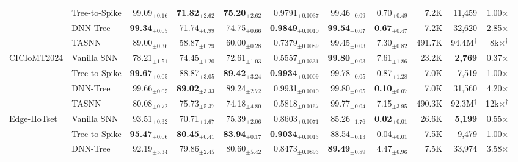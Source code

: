\begin{table}[!ht]
{\begin{tabular}{l l r r r r r r r r r}
& Tree-to-Spike & 99.09$_{\pm0.16}$ & \cellcolor{bestcell}\textbf{71.82$_{\pm2.62}$} & \cellcolor{bestcell}\textbf{75.20$_{\pm2.62}$} & 0.9791$_{\pm0.0037}$ & 99.46$_{\pm0.09}$ & 0.70$_{\pm0.49}$ & 7.2K & 11,459 & 1.00$\times$ \\
& DNN-Tree      & \cellcolor{bestcell}\textbf{99.34$_{\pm0.05}$} & 71.74$_{\pm0.99}$ & 74.75$_{\pm0.66}$ & \cellcolor{bestcell}\textbf{0.9849$_{\pm0.0010}$} & \cellcolor{bestcell}\textbf{99.54$_{\pm0.07}$} & \cellcolor{bestcell}\textbf{0.67$_{\pm0.47}$} & 7.2K & 32,620 & 2.85$\times$ \\
& TASNN         & 89.00$_{\pm0.36}$ & 58.87$_{\pm0.29}$ & 60.00$_{\pm0.28}$ & 0.7379$_{\pm0.0089}$ & 99.45$_{\pm0.03}$ & 7.30$_{\pm0.82}$ & 491.7K & 94.4M$^\dagger$ & 8k$\times$$^\dagger$ \\
\midrule
\multirow{4}{*}{CICIoMT2024}
& Vanilla SNN   & 78.21$_{\pm1.51}$ & 74.45$_{\pm1.20}$ & 72.61$_{\pm1.03}$ & 0.5557$_{\pm0.0331}$ & \cellcolor{bestcell}\textbf{99.80$_{\pm0.03}$} & 7.61$_{\pm1.86}$ & 23.2K & \cellcolor{bestcell}\textbf{2,769} & 0.37$\times$ \\
& Tree-to-Spike & \cellcolor{bestcell}\textbf{99.67$_{\pm0.05}$} & 88.87$_{\pm3.05}$ & \cellcolor{bestcell}\textbf{89.42$_{\pm3.24}$} & \cellcolor{bestcell}\textbf{0.9934$_{\pm0.0009}$} & 99.78$_{\pm0.05}$ & 0.87$_{\pm1.28}$ & 7.0K & 7,519 & 1.00$\times$ \\
& DNN-Tree      & 99.66$_{\pm0.05}$ & \cellcolor{bestcell}\textbf{89.02$_{\pm3.33}$} & 89.24$_{\pm2.72}$ & 0.9931$_{\pm0.0010}$ & 99.80$_{\pm0.05}$ & \cellcolor{bestcell}\textbf{0.10$_{\pm0.07}$} & 7.0K & 31,560 & 4.20$\times$ \\
& TASNN         & 80.08$_{\pm0.72}$ & 75.73$_{\pm5.37}$ & 74.18$_{\pm4.80}$ & 0.5818$_{\pm0.0167}$ & 99.77$_{\pm0.04}$ & 7.15$_{\pm3.95}$ & 490.3K & 92.3M$^\dagger$ & 12k$\times$$^\dagger$ \\
\midrule
\multirow{4}{*}{Edge-IIoTset}
& Vanilla SNN   & 93.51$_{\pm0.32}$ & 70.71$_{\pm1.67}$ & 75.39$_{\pm2.06}$ & 0.8603$_{\pm0.0071}$ & 85.26$_{\pm1.76}$ & \cellcolor{bestcell}\textbf{0.02$_{\pm0.01}$} & 26.6K & \cellcolor{bestcell}\textbf{5,199} & 0.55$\times$ \\
& Tree-to-Spike & \cellcolor{bestcell}\textbf{95.47$_{\pm0.06}$} & \cellcolor{bestcell}\textbf{80.45$_{\pm0.41}$} & \cellcolor{bestcell}\textbf{83.94$_{\pm0.17}$} & \cellcolor{bestcell}\textbf{0.9034$_{\pm0.0013}$} & 88.54$_{\pm0.13}$ & 0.04$_{\pm0.01}$ & 7.5K & 9,479 & 1.00$\times$ \\
& DNN-Tree      & 92.19$_{\pm5.34}$ & 79.86$_{\pm2.45}$ & 80.60$_{\pm5.42}$ & 0.8473$_{\pm0.0893}$ & \cellcolor{bestcell}\textbf{89.49$_{\pm0.89}$} & 4.47$_{\pm6.96}$ & 7.5K & 33,974 & 3.58$\times$ \\

\end{tabular}}
\end{table}
